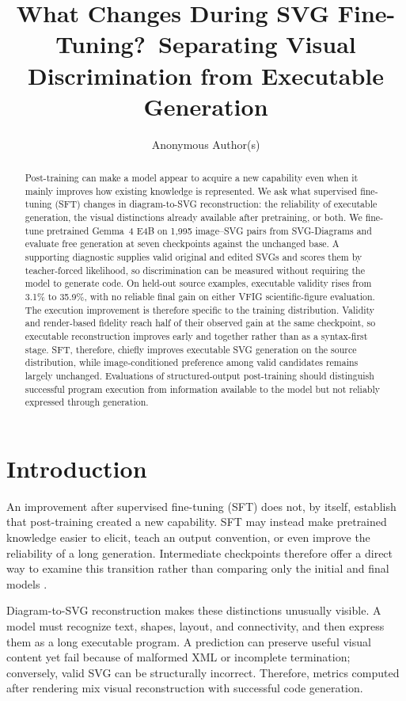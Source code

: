\documentclass{article}
\title{What Changes During SVG Fine-Tuning?\
Separating Visual Discrimination from Executable Generation}
\author{Anonymous Author(s)}
\begin{document}
\nolinenumbers

\maketitle

\begin{abstract}
Post-training can make a model appear to acquire a new capability even when it mainly improves how existing knowledge is represented. We ask what supervised fine-tuning (SFT) changes in diagram-to-SVG reconstruction: the reliability of executable generation, the visual distinctions already available after pretraining, or both. We fine-tune pretrained Gemma~4 E4B on 1,995 image--SVG pairs from SVG-Diagrams and evaluate free generation at seven checkpoints against the unchanged base. A supporting diagnostic supplies valid original and edited SVGs and scores them by teacher-forced likelihood, so discrimination can be measured without requiring the model to generate code. On held-out source examples, executable validity rises from 3.1\% to 35.9\%, with no reliable final gain on either VFIG scientific-figure evaluation. The execution improvement is therefore specific to the training distribution. Validity and render-based fidelity reach half of their observed gain at the same checkpoint, so executable reconstruction improves early and together rather than as a syntax-first stage. SFT, therefore, chiefly improves executable SVG generation on the source distribution, while image-conditioned preference among valid candidates remains largely unchanged. Evaluations of structured-output post-training should distinguish successful program execution from information available to the model but not reliably expressed through generation.
\end{abstract}

\section{Introduction}

An improvement after supervised fine-tuning (SFT) does not, by itself, establish that post-training created a new capability. SFT may instead make pretrained knowledge easier to elicit, teach an output convention, or even improve the reliability of a long generation. Intermediate checkpoints therefore offer a direct way to examine this transition rather than comparing only the initial and final models \citep{biderman2023pythia,zhou2023lima}.

Diagram-to-SVG reconstruction makes these distinctions unusually visible. A model must recognize text, shapes, layout, and connectivity, and then express them as a long executable program. A prediction can preserve useful visual content yet fail because of malformed XML or incomplete termination; conversely, valid SVG can be structurally incorrect. Therefore, metrics computed after rendering mix visual reconstruction with successful code generation.
\end{document}
